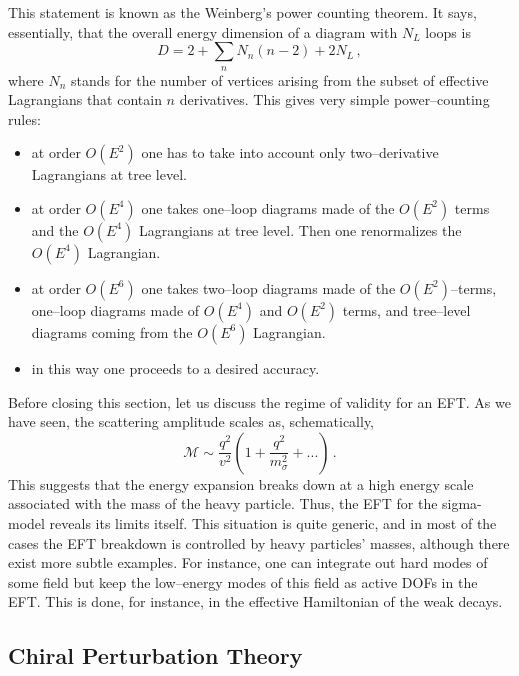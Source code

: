 \documentclass[12pt]{article}
\newcommand{\be}{\begin{equation}}
\newcommand{\ee}{\end{equation}}
\begin{document}
This statement is known as the Weinberg's power counting theorem.
It says, essentially, that the overall energy dimension of a diagram with $N_L$
loops is
\be
D=2+\sum_{n}N_n(n-2)+2N_L\,,
\ee
where $N_n$ stands for the number of vertices arising from the subset
of effective Lagrangians that contain $n$ derivatives.
This gives very simple power--counting rules:
\begin{itemize}
\item at order $O(E^2)$ one has to take into account only two--derivative Lagrangians at tree level.
\item at order $O(E^4)$ one takes one--loop diagrams made of the $O(E^2)$ terms and the $O(E^4)$
Lagrangians at tree level. Then one renormalizes the $O(E^4)$ Lagrangian.
\item at order $O(E^6)$ one takes two--loop diagrams made of the $O(E^2)$--terms, one--loop
diagrams made of $O(E^4)$ and $O(E^2)$ terms, and tree--level diagrams coming from the $O(E^6)$ Lagrangian.
\item in this way one proceeds to a desired accuracy.
\end{itemize}

Before closing this section, let us discuss the regime of validity for an EFT. As
we have seen, the scattering amplitude scales as, schematically,
\be
\mathcal{M}\sim \frac{q^2}{v^2}\left(1+\frac{q^2}{m_\sigma^2}+...\right)\,.
\ee
This suggests that the energy expansion breaks down at a high energy scale
associated with the mass of the heavy particle.
Thus, the EFT for the sigma-model reveals its limits itself.
This situation is quite generic, and in most of the cases the EFT breakdown is controlled by heavy particles' masses,  
although there exist more subtle examples.
For instance, one can integrate out hard modes of some field but keep the low--energy modes
of this field as active DOFs in the EFT. This is done, for instance,
in the effective Hamiltonian of the weak decays.

\subsection{Chiral Perturbation Theory}
\end{document}
